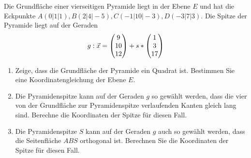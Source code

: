  Die Grundfläche einer vierseitigen Pyramide liegt in der Ebene $E$ und hat die Eckpunkte $A(0|1|1),B(2|4|-5),C(-1|10|-3),D(-3|7|3)$.
Die Spitze der Pyramide liegt auf der Geraden
\begin{equation*}
	g:\vec x=\begin{pmatrix} 9\\10\\12 \end{pmatrix}+s*\begin{pmatrix} 1\\3\\17 \end{pmatrix}
\end{equation*}
\begin{enumerate}
	\item Zeige, dass die Grundfläche der Pyramide ein Quadrat ist. Bestimmen Sie eine Koordinatengleichung der Ebene $E$.
	\item Die Pyramidenspitze kann auf der Geraden $g$ so gewählt werden, dass die vier von der Grundfläche zur Pyramidenspitze verlaufenden Kanten gleich lang sind. Berechne die Koordinaten der Spitze für diesen Fall.
	\item Die Pyramidenspitze $S$ kann auf der Geraden $g$ auch so gewählt werden, dass die Seitenfläche $ABS$ orthogonal ist. Berechnen Sie die Koordinaten der Spitze für diesen Fall.
\end{enumerate}
